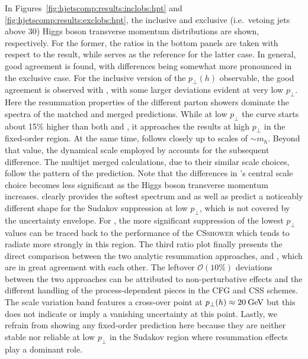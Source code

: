 In Figures~\ref{fig:hjetscomp:results:inclobs:hpt} and
\ref{fig:hjetscomp:results:exclobs:hpt}, the inclusive and exclusive
(i.e.~vetoing jets above $30$\gev) Higgs boson transverse momentum
distributions are shown, respectively.  For the former, the ratios in
the bottom panels are taken with respect to the \HqT result, while
\Powheg \NNLOPS serves as the reference for the latter case. In
general, good agreement is found, with differences being somewhat more
pronounced in the exclusive case. For the inclusive version of the
$p_\perp(h)$ observable, the good agreement is observed with \HqT,
with some larger deviations evident at very low $p_\perp$. Here the
resummation properties of the different parton showers dominate the
spectra of the matched and merged predictions. While at low $p_\perp$
the \Sherpa \NNLOPS curve starts about 15\% higher than both \HqT and
\Powheg \NNLOPS, it approaches the \HqT results at high $p_\perp$ 
in the fixed-order region. At the same time, \Powheg \NNLOPS follows 
\HqT closely up to scales of $\sim m_h$. Beyond that value, the 
dynamical scale employed by \Powheg \NNLOPS accounts for the
subsequent difference. The multijet merged calculations, due to their
similar scale choices, follow the pattern of the \Powheg \NNLOPS
prediction. Note that the differences in \MGaMC's central scale
choice becomes less significant as the Higgs boson transverse momentum
increases. \Herwig clearly provides the softest spectrum and \Sherpa
as well as \MGaMC predict a noticeably different shape for the Sudakov
suppression at low $p_\perp$, which is not covered by the \HqT
uncertainty envelope. For \Sherpa, the more significant suppression of
the lowest $p_\perp$ values can be traced back to the performance of the
\textsc{CSshower} which tends to radiate more strongly in this region.
The third ratio plot finally presents the direct comparison between
the two analytic resummation approaches, \HqT and \Resbos,
which are in great agreement with each other. The leftover
$\mathcal{O}(10\%)$ deviations between the two approaches can be
attributed to non-perturbative effects and the different handling of
the process-dependent pieces in the CFG and CSS schemes. The
\Resbos scale variation band features a cross-over point at
$p_\perp(h)\approx20\text{\:GeV}$ but this does not indicate or imply a
vanishing uncertainty at this point.
Lastly, we refrain from showing any fixed-order prediction here
because they are neither stable nor reliable at low $p_\perp$ in the
Sudakov region where resummation effects play a dominant role.

